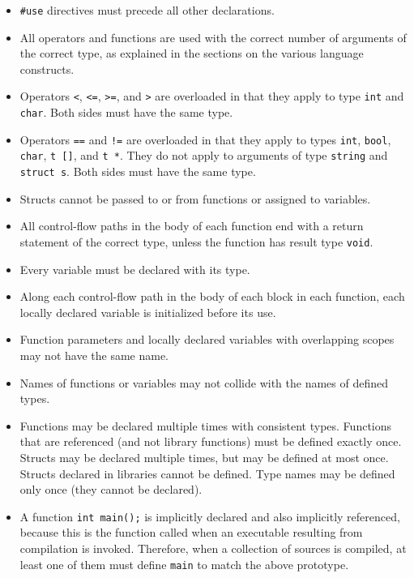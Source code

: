\documentclass[11pt]{article}
\begin{document}
\begin{itemize}
\item \verb'#use' directives must precede all other
  declarations.
\item All operators and functions are used with the
  correct number of arguments of the correct type,
  as explained in the sections on the various language
  constructs.
\item Operators \verb'<', \verb'<=', \verb'>=', and
  \verb'>' are overloaded in that they apply to
  type \verb'int' and \verb'char'.  Both sides must
  have the same type.
\item Operators \verb'==' and \verb'!=' are overloaded
  in that they apply to types \verb'int', \verb'bool',
  \verb'char', \verb't []', and \verb't *'.  They do
  not apply to arguments of type \verb'string' and
  \verb'struct s'.  Both sides must have the same type.
\item Structs cannot be passed to or from functions
  or assigned to variables.
\item All control-flow paths in the body of each function
  end with a return statement of the correct type,
  unless the function has result type \verb'void'.
\item Every variable must be declared with its type.
\item Along each control-flow path in the body of each
  block in each function, each locally declared variable
  is initialized before its use.
\item Function parameters and locally declared variables
  with overlapping scopes may not have the same name.
\item Names of functions or variables may not collide with the names
  of defined types.
\item Functions may be declared multiple times with consistent types.
  Functions that are referenced (and not library functions) must be
  defined exactly once.  Structs may be declared multiple times, but
  may be defined at most once.  Structs declared in libraries cannot
  be defined.  Type names may be defined only once (they cannot be
  declared).
\item A function \verb'int main();' is implicitly declared and
  also implicitly referenced, because this is the function called
  when an executable resulting from compilation is invoked.
  Therefore, when a collection of sources is compiled, at
  least one of them must define \verb'main' to match the
  above prototype.


\end{itemize}
\end{document}

